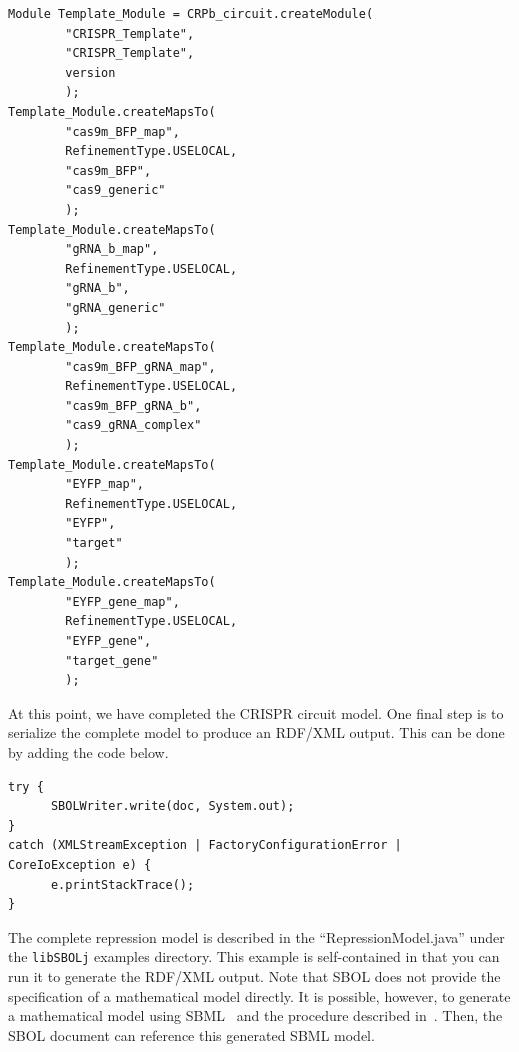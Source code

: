 \vspace{\abovedisplayskip}
\begin{minipage}{0.95\textwidth}
\begin{lstlisting}
Module Template_Module = CRPb_circuit.createModule(
        "CRISPR_Template", 
        "CRISPR_Template", 
        version
        );
Template_Module.createMapsTo(
        "cas9m_BFP_map", 
        RefinementType.USELOCAL,
        "cas9m_BFP", 
        "cas9_generic"
        );
Template_Module.createMapsTo(
        "gRNA_b_map", 
        RefinementType.USELOCAL, 
        "gRNA_b", 
        "gRNA_generic"
        );
Template_Module.createMapsTo(
        "cas9m_BFP_gRNA_map", 
        RefinementType.USELOCAL, 
        "cas9m_BFP_gRNA_b", 
        "cas9_gRNA_complex"
        );
Template_Module.createMapsTo(
        "EYFP_map", 
        RefinementType.USELOCAL,
        "EYFP", 
        "target"
        );
Template_Module.createMapsTo(
        "EYFP_gene_map", 
        RefinementType.USELOCAL, 
        "EYFP_gene", 
        "target_gene"
        );
\end{lstlisting}
\end{minipage}

At this point, we have completed the CRISPR circuit model. One final step is to serialize the complete model to produce an RDF/XML output. This can be done by adding the code below.

\vspace{\abovedisplayskip}
\begin{minipage}{0.95\textwidth}
\begin{lstlisting}
try {
      SBOLWriter.write(doc, System.out);
}
catch (XMLStreamException | FactoryConfigurationError | CoreIoException e) {
      e.printStackTrace();
}
\end{lstlisting}
\end{minipage}

The complete repression model is described in the ``RepressionModel.java'' under the {\tt libSBOLj} examples directory. This example is self-contained in that you can run it to generate the RDF/XML output. Note that SBOL does not provide the specification of a mathematical model directly. It is possible, however, to generate a mathematical model using SBML~\cite{SBML} and the procedure described in~\cite{roehner2015generating}. Then, the SBOL document can reference this generated SBML model.

